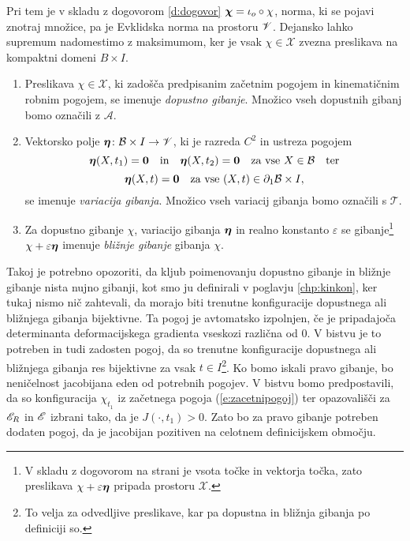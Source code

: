 Pri tem je v skladu z dogovorom \ref{d:dogovor} $\boldsymbol \chi=\iota_o\circ\chi$, norma, ki se pojavi
znotraj množice, pa je Evklidska norma na prostoru $\mathscr V$.
Dejansko lahko supremum nadomestimo z maksimumom, ker je vsak $\chi\in\mathcal{X}$
zvezna preslikava na kompaktni domeni $B\times I$.

\begin{definicija}
	\begin{enumerate}
		\item Preslikava $\chi\in\mathcal{X}$, ki zadošča predpisanim začetnim pogojem in kinematičnim robnim pogojem,
			se imenuje \emph{dopustno gibanje}. Množico vseh dopustnih gibanj bomo označili z $\mathcal{A}$.
		\item Vektorsko polje $\boldsymbol \eta\colon \mathcal B\times I\to\mathscr V$, ki je razreda $C^2$ in
			ustreza pogojem
			\[
				\boldsymbol \eta(X,t_1)=\boldsymbol 0\quad \textrm{in} \quad
				\boldsymbol \eta(X,t_2)=\boldsymbol 0\quad \textrm{za vse}\ X\in \mathcal B\quad\textrm{ter}
			\]
			\[
				\vek{\eta}(X,t)=\vek{0}\quad \textrm{za vse}\ (X,t)\in \partial_1 \B\times I,
			\]
			se imenuje \emph{variacija gibanja}. Množico vseh variacij gibanja bomo ozna\-čili s $\mathcal{T}$.
		\item Za dopustno gibanje $\chi$, variacijo gibanja $\boldsymbol \eta$ in realno konstanto $\varepsilon$ se gibanje\footnote{
			V skladu z dogovorom na strani \pageref{seto} je vsota točke in vektorja točka, zato preslikava
			$\chi+\varepsilon\boldsymbol \eta$ pripada prostoru $\mathcal{X}$.}
			$\chi+\varepsilon\boldsymbol \eta$ imenuje \emph{bližnje gibanje} gibanja $\chi$.
	\end{enumerate}
\end{definicija}

Takoj je potrebno opozoriti, da kljub poimenovanju dopustno gibanje in bližnje gibanje nista nujno gibanji,
kot smo ju definirali v poglavju \ref{chp:kinkon}, ker tukaj nismo nič zahtevali, da morajo biti
trenutne konfiguracije dopustnega ali bližnjega gibanja bijektivne.
Ta pogoj je avtomatsko izpolnjen, če je pripadajoča determinanta deformacijskega
gradienta vseskozi različna od 0. V bistvu je to potreben in tudi zadosten pogoj, da so trenutne konfiguracije
dopustnega ali bližnjega gibanja res bijektivne za vsak $t\in I$\footnote{
To velja za odvedljive preslikave, kar pa dopustna in bližnja gibanja po definiciji so.}.
Ko bomo iskali pravo gibanje, bo neničelnost jacobijana eden od potrebnih pogojev.
V bistvu bomo predpostavili, da so konfiguracija $\chi_{t_1}$ iz začetnega pogoja (\ref{e:zacetnipogoj})
ter opazovališči za $\mathscr E_R$ in $\mathscr E$ izbrani tako, da je $J(\cdot,t_1)>0$. Zato bo za pravo gibanje
potreben dodaten pogoj, da je jacobijan pozitiven na celotnem definicijskem območju.

